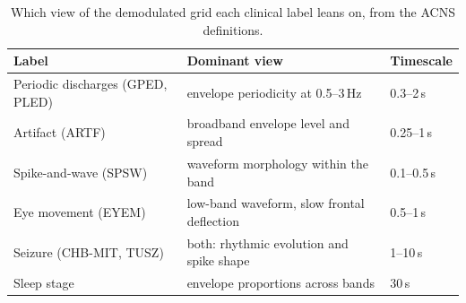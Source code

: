 \begin{table}[t]
\centering
\TableStyle
\caption{Which view of the demodulated grid each clinical label leans on, from the ACNS definitions.}
\label{tab:labels}
\setlength{\tabcolsep}{3pt}
\begin{tabular}{@{}>{\raggedright\arraybackslash}p{2.55cm}>{\raggedright\arraybackslash}p{3.6cm}l@{}}
\toprule
Label & Dominant view & Timescale \\
\midrule
Periodic discharges (GPED, PLED) & envelope periodicity at 0.5--3\,Hz & 0.3--2\,s \\
Artifact (ARTF) & broadband envelope level and spread & 0.25--1\,s \\
Spike-and-wave (SPSW) & waveform morphology within the band & 0.1--0.5\,s \\
Eye movement (EYEM) & low-band waveform, slow frontal deflection & 0.5--1\,s \\
Seizure (CHB-MIT, TUSZ) & both: rhythmic evolution and spike shape & 1--10\,s \\
Sleep stage & envelope proportions across bands & 30\,s \\
\bottomrule
\end{tabular}
\end{table}

